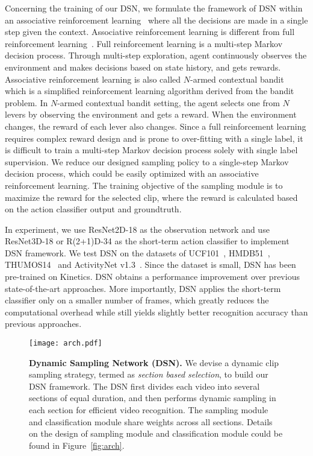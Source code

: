 \documentclass[journal]{IEEEtran}
\begin{document}
Concerning the training of our DSN, we formulate the framework of DSN within an associative reinforcement learning~\cite{associative} where all the decisions are made in a single step given the context.
Associative reinforcement learning is different from full reinforcement learning~\cite{SuttonB98}.
Full reinforcement learning is a multi-step Markov decision process.
Through multi-step exploration, agent continuously observes the environment and makes decisions based on state history, and gets rewards.
Associative reinforcement learning is also called $N$-armed contextual bandit~\cite{bandit} which is a simplified reinforcement learning algorithm derived from the bandit problem.
In $N$-armed contextual bandit setting, the agent selects one from $N$ levers by observing the environment and gets a reward.
When the environment changes, the reward of each lever also changes.
Since a full reinforcement learning requires complex reward design and is prone to over-fitting with a single label, it is difficult to train a multi-step Markov decision process solely with single label supervision.
We reduce our designed sampling policy to a single-step Markov decision process, which could be easily optimized with an associative reinforcement learning.
The training objective of the sampling module is to maximize the reward for the selected clip, where the reward is calculated based on the action classifier output and groundtruth.

In experiment, we use ResNet2D-18 as the observation network and use ResNet3D-18 or R(2+1)D-34 as the short-term action classifier to implement DSN framework.
We test DSN on the datasets of UCF101~\cite{abs-1212-0402}, HMDB51~\cite{KuehneJGPS11}, THUMOS14~\cite{THUMOS14} and ActivityNet v1.3~\cite{anet}.
Since the dataset is small, DSN has been pre-trained on Kinetics.
DSN obtains a performance improvement over previous state-of-the-art approaches.
More importantly, DSN applies the short-term classifier only on a smaller number of frames, which greatly reduces the computational overhead while still yields slightly better recognition accuracy than previous approaches.



\begin{figure*}[ht]
  \centering
  \texttt{[image: arch.pdf]}
  \caption{\textbf{Dynamic Sampling Network (DSN).} We devise a dynamic clip sampling strategy, termed as {\em section based selection}, to build our DSN framework. The DSN first divides each video into several sections of equal duration, and then performs dynamic sampling in each section for efficient video recognition. The sampling module and classification module share weights across all sections. Details on the design of sampling module and classification module could be found in Figure~\ref{fig:arch}. }
  \label{fig:arch2}
\end{figure*}
\end{document}
